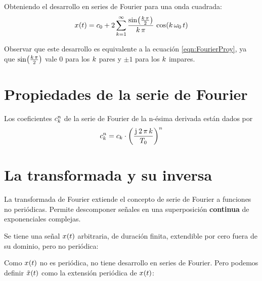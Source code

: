 \begin{mdframed}[style=ExampleFrame]
    Obteniendo el desarrollo en series de Fourier para una onda cuadrada:
    \[
        \fx[x]{t} = c_0 + 2 \sum_{\kth=1}^{\infty} \frac{\fx[\sin]{\frac{\kth \, \pi}{2}}}{\kth \, \pi} \, \fx[\cos]{\kth \, \omega_0 \, t}
    \]

    Observar que este desarrollo es equivalente a la ecuación \ref{eqn:FourierProy}, ya que $\fx[\sin]{\frac{\kth \, \pi}{2}}$ vale 0 para los $\kth$ pares y $\pm1$ para los $\kth$ impares.
\end{mdframed}

\section{Propiedades de la serie de Fourier}

\begin{mdframed}[style=PropertyFrame]
    \begin{prop}
    \end{prop}
    Los coeficientes $c_\kth^\nth$ de la serie de Fourier de la n-ésima derivada están dados por
    \[
        c_\kth^\nth = c_\kth \cdot \inParentheses{\frac{\iu \, 2 \, \pi \, \kth}{T_0}}^\nth
    \]
\end{mdframed}

\section{La transformada y su inversa}

La transformada de Fourier extiende el concepto de serie de Fourier a funciones no periódicas.
Permite descomponer señales en una superposición \textbf{continua} de exponenciales complejas.

Se tiene una señal $\fx[x]{t}$ arbitraria, de duración finita, extendible por cero fuera de su dominio, pero no periódica:

\begin{center}
    \def\svgwidth{0.8\linewidth}
    
\end{center}

Como $\fx[x]{t}$ no es periódica, no tiene desarrollo en series de Fourier.
Pero podemos definir $\fx[\tilde{x}]{t}$ como la extensión periódica de $\fx[x]{t}$:

\begin{center}
    \def\svgwidth{0.8\linewidth}
    
\end{center}

